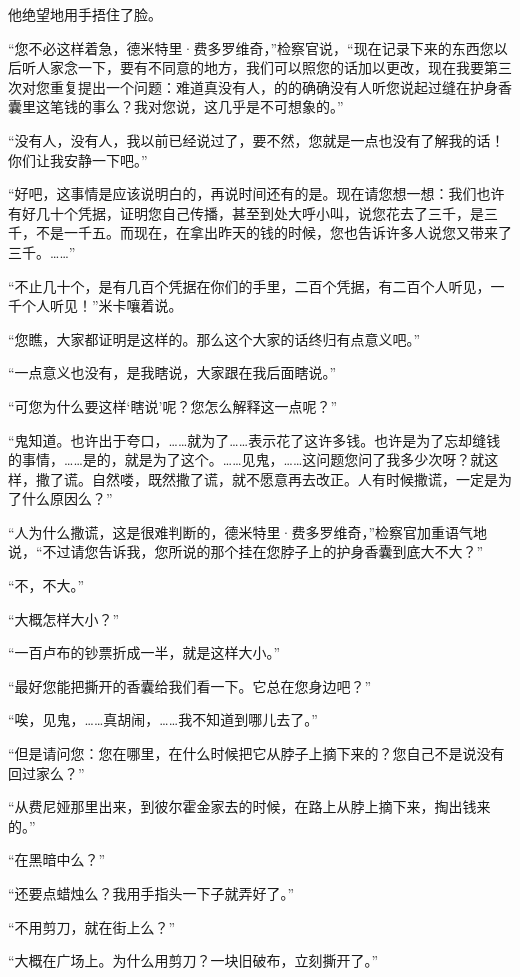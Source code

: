 \par 他绝望地用手捂住了脸。
\par “您不必这样着急，德米特里·费多罗维奇，”检察官说，“现在记录下来的东西您以后听人家念一下，要有不同意的地方，我们可以照您的话加以更改，现在我要第三次对您重复提出一个问题：难道真没有人，的的确确没有人听您说起过缝在护身香囊里这笔钱的事么？我对您说，这几乎是不可想象的。”
\par “没有人，没有人，我以前已经说过了，要不然，您就是一点也没有了解我的话！你们让我安静一下吧。”
\par “好吧，这事情是应该说明白的，再说时间还有的是。现在请您想一想：我们也许有好几十个凭据，证明您自己传播，甚至到处大呼小叫，说您花去了三千，是三千，不是一千五。而现在，在拿出昨天的钱的时候，您也告诉许多人说您又带来了三千。……”
\par “不止几十个，是有几百个凭据在你们的手里，二百个凭据，有二百个人听见，一千个人听见！”米卡嚷着说。
\par “您瞧，大家都证明是这样的。那么这个大家的话终归有点意义吧。”
\par “一点意义也没有，是我瞎说，大家跟在我后面瞎说。”
\par “可您为什么要这样‘瞎说’呢？您怎么解释这一点呢？”
\par “鬼知道。也许出于夸口，……就为了……表示花了这许多钱。也许是为了忘却缝钱的事情，……是的，就是为了这个。……见鬼，……这问题您问了我多少次呀？就这样，撒了谎。自然喽，既然撒了谎，就不愿意再去改正。人有时候撒谎，一定是为了什么原因么？”
\par “人为什么撒谎，这是很难判断的，德米特里·费多罗维奇，”检察官加重语气地说，“不过请您告诉我，您所说的那个挂在您脖子上的护身香囊到底大不大？”
\par “不，不大。”
\par “大概怎样大小？”
\par “一百卢布的钞票折成一半，就是这样大小。”
\par “最好您能把撕开的香囊给我们看一下。它总在您身边吧？”
\par “唉，见鬼，……真胡闹，……我不知道到哪儿去了。”
\par “但是请问您：您在哪里，在什么时候把它从脖子上摘下来的？您自己不是说没有回过家么？”
\par “从费尼娅那里出来，到彼尔霍金家去的时候，在路上从脖上摘下来，掏出钱来的。”
\par “在黑暗中么？”
\par “还要点蜡烛么？我用手指头一下子就弄好了。”
\par “不用剪刀，就在街上么？”
\par “大概在广场上。为什么用剪刀？一块旧破布，立刻撕开了。”
